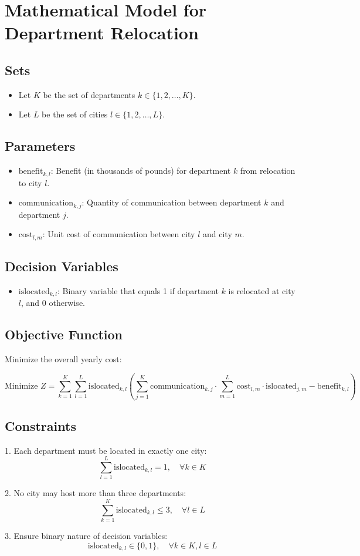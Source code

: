 \documentclass{article}
\begin{document}
\section*{Mathematical Model for Department Relocation}

\subsection*{Sets}
\begin{itemize}
    \item Let \( K \) be the set of departments \( k \in \{1, 2, \ldots, K\} \).
    \item Let \( L \) be the set of cities \( l \in \{1, 2, \ldots, L\} \).
\end{itemize}

\subsection*{Parameters}
\begin{itemize}
    \item \( \text{benefit}_{k, l} \): Benefit (in thousands of pounds) for department \( k \) from relocation to city \( l \).
    \item \( \text{communication}_{k, j} \): Quantity of communication between department \( k \) and department \( j \).
    \item \( \text{cost}_{l, m} \): Unit cost of communication between city \( l \) and city \( m \).
\end{itemize}

\subsection*{Decision Variables}
\begin{itemize}
    \item \( \text{islocated}_{k, l} \): Binary variable that equals 1 if department \( k \) is relocated at city \( l \), and 0 otherwise.
\end{itemize}

\subsection*{Objective Function}
Minimize the overall yearly cost:

\[
\text{Minimize } Z = \sum_{k=1}^{K} \sum_{l=1}^{L} \text{islocated}_{k, l} \left( \sum_{j=1}^{K} \text{communication}_{k, j} \cdot \sum_{m=1}^{L} \text{cost}_{l, m} \cdot \text{islocated}_{j, m} - \text{benefit}_{k, l} \right)
\]

\subsection*{Constraints}
1. Each department must be located in exactly one city:
\[
\sum_{l=1}^{L} \text{islocated}_{k, l} = 1, \quad \forall k \in K
\]

2. No city may host more than three departments:
\[
\sum_{k=1}^{K} \text{islocated}_{k, l} \leq 3, \quad \forall l \in L
\]

3. Ensure binary nature of decision variables:
\[
\text{islocated}_{k, l} \in \{0, 1\}, \quad \forall k \in K, l \in L
\]
\end{document}
